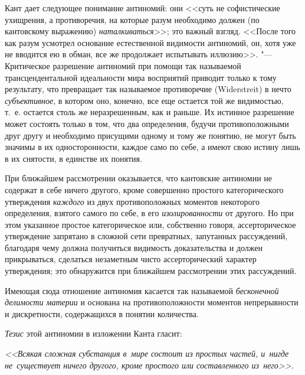 Кант дает следующее понимание антиномий: они <<суть не софистические
ухищрения, а противоречия, на которые разум необходимо должен (по
кантовскому выражению) {\em наталкиваться}>>; это важный
взгляд. <<После того как разум усмотрел основание естественной видимости
антиномий, он, хотя уже не вводится ею в обман, все же продолжает
испытывать иллюзию>>. "--- Критическое разрешение
антиномий при помощи так называемой трансцендентальной идеальности мира
восприятий приводит только к тому результату, что превращает так называемое
противоречие (Widerstreit) в нечто {\em субъективное},
в котором оно, конечно, все еще остается той же видимостью, т.~е. остается
столь же неразрешенным, как и раньше. Их истинное разрешение может состоять
только в том, что два определения, будучи противоположными друг другу и
необходимо присущими одному и тому же понятию, не могут быть значимы в их
односторонности, каждое само по себе, а имеют свою истину лишь в их
снятости, в единстве их понятия.

При ближайшем рассмотрении оказывается, что кантовские антиномии не содержат
в себе ничего другого, кроме совершенно простого категорического
утверждения {\em каждого} из двух противоположных
моментов некоторого определения, взятого самого по себе, в его
{\em изолированности} от другого. Но при этом указанное
простое категорическое или, собственно говоря, ассерторическое утверждение
запрятано в сложной сети превратных, запутанных рассуждений, благодаря чему
должна получиться видимость доказательства и должен прикрываться, сделаться
незаметным чисто ассерторический характер утверждения; это обнаружится при
ближайшем рассмотрении этих рассуждений.

Имеющая сюда отношение антиномия касается так называемой
{\em бесконечной делимости материи} и основана на
противоположности моментов непрерывности и дискретности, содержащихся в
понятии количества.

{\em Тезис} этой антиномии в изложении Канта гласит:

{\em <<Всякая сложная субстанция в~мире состоит из простых частей, и~нигде
не~существует ничего другого, кроме простого или составленного из~него>>.}

